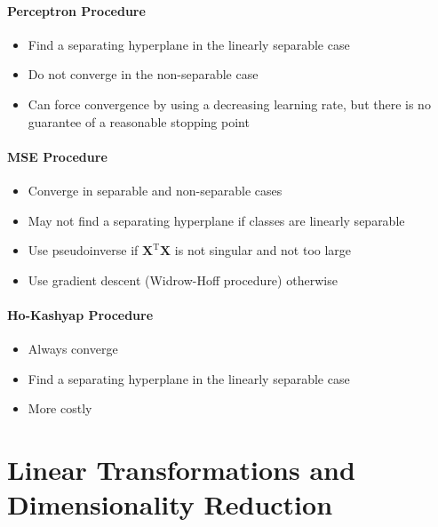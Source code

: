 \documentclass[11pt,a4paper]{article}
\theoremstyle{definition}
\theoremstyle{plain}
\theoremstyle{remark}
\begin{document}
\begin{tcolorbox}[colback=purple!5!white,colframe=purple!75!black,title=\textbf{Comparison of Methods}]

\subsection*{Perceptron Procedure}
\begin{itemize}
    \item Find a separating hyperplane in the linearly separable case
    \item Do not converge in the non-separable case
    \item Can force convergence by using a decreasing learning rate, but there is no guarantee of a reasonable stopping point
\end{itemize}

\subsection*{MSE Procedure}
\begin{itemize}
    \item Converge in separable and non-separable cases
    \item May not find a separating hyperplane if classes are linearly separable
    \item Use pseudoinverse if $\mathbf{X}^{\mathrm{T}}\mathbf{X}$ is not singular and not too large
    \item Use gradient descent (Widrow-Hoff procedure) otherwise
\end{itemize}

\subsection*{Ho-Kashyap Procedure}
\begin{itemize}
    \item Always converge
    \item Find a separating hyperplane in the linearly separable case
    \item More costly
\end{itemize}
\end{tcolorbox}




\newpage 

\part{Linear Transformations and Dimensionality Reduction}
\end{document}

